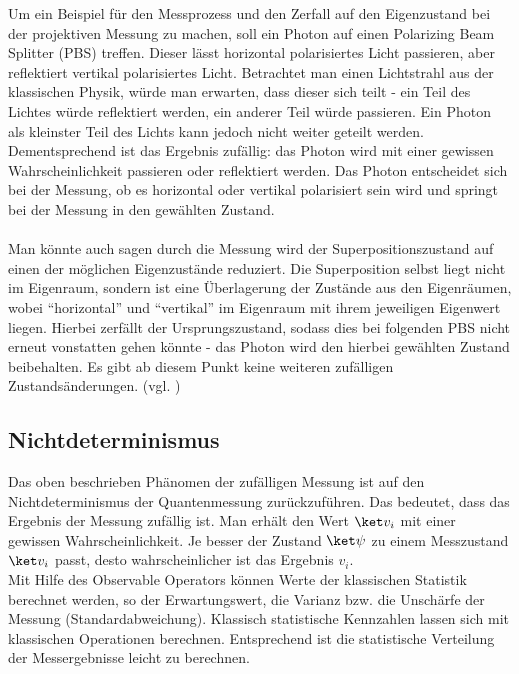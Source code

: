 Um ein Beispiel für den Messprozess und den Zerfall auf den Eigenzustand bei der projektiven Messung zu machen, soll ein Photon auf einen Polarizing Beam Splitter (PBS) treffen. Dieser lässt horizontal polarisiertes Licht passieren, aber reflektiert vertikal polarisiertes Licht.
Betrachtet man einen Lichtstrahl aus der klassischen Physik, würde man erwarten, dass dieser sich teilt - ein Teil des Lichtes würde reflektiert werden, ein anderer Teil würde passieren. Ein Photon als kleinster Teil des Lichts kann jedoch nicht weiter geteilt werden.
Dementsprechend ist das Ergebnis zufällig: das Photon wird mit einer gewissen Wahrscheinlichkeit passieren oder reflektiert werden. Das Photon entscheidet sich bei der Messung, ob es horizontal oder vertikal polarisiert sein wird und springt bei der Messung in den gewählten Zustand. \\ \\
Man könnte auch sagen durch die Messung wird der Superpositionszustand auf einen der möglichen Eigenzustände reduziert. Die Superposition selbst liegt nicht im Eigenraum, sondern ist eine Überlagerung der Zustände aus den Eigenräumen, wobei ``horizontal'' und ``vertikal'' im Eigenraum mit ihrem jeweiligen Eigenwert liegen. Hierbei zerfällt der Ursprungszustand, sodass dies bei folgenden PBS nicht erneut vonstatten gehen könnte - das Photon wird den hierbei gewählten Zustand beibehalten.
Es gibt ab diesem Punkt keine weiteren zufälligen Zustandsänderungen. 
(vgl. \cite[Ch. 1.4.1]{lvovsky_quantum_2018})

\subsection{Nichtdeterminismus}
\label{subsec: Nichtdeterminismus}
Das oben beschrieben Phänomen der zufälligen Messung ist auf den Nichtdeterminismus der Quantenmessung zurückzuführen. Das bedeutet, dass das Ergebnis der Messung zufällig ist. Man erhält den Wert $\ket v_i$ mit einer gewissen Wahrscheinlichkeit.
Je besser der Zustand $\ket \psi$ zu einem Messzustand $\ket v_i$ passt, desto wahrscheinlicher ist das Ergebnis $v_i$. 
\\

Mit Hilfe des Observable Operators können Werte der klassischen Statistik berechnet werden, so der Erwartungswert, die Varianz bzw. die Unschärfe der Messung (Standardabweichung). 
Klassisch statistische Kennzahlen lassen sich mit klassischen Operationen berechnen. Entsprechend ist die statistische Verteilung der Messergebnisse leicht zu berechnen. 
\\ 

